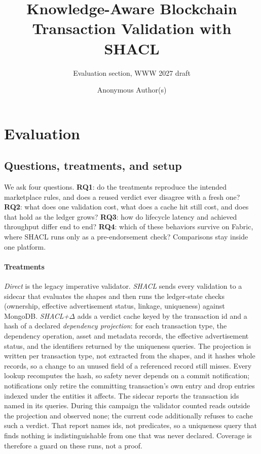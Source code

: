 \documentclass[sigconf,anonymous,review]{acmart}
\title{Knowledge-Aware Blockchain Transaction Validation with SHACL}
\subtitle{Evaluation section, WWW 2027 draft}
\author{Anonymous Author(s)}
\begin{document}
\maketitle

\setcounter{section}{4}
\section{Evaluation}
\label{sec:eval}

\subsection{Questions, treatments, and setup}
\label{sec:setup}

We ask four questions. \textbf{RQ1}: do the treatments reproduce the
intended marketplace rules, and does a reused verdict ever disagree with a
fresh one? \textbf{RQ2}: what does one validation cost, what does a cache hit
still cost, and does that hold as the ledger grows? \textbf{RQ3}: how do
lifecycle latency and achieved throughput differ end to end? \textbf{RQ4}:
which of these behaviors survive on Fabric, where SHACL runs only as a
pre-endorsement check? Comparisons stay inside one platform.

\paragraph{Treatments}
\emph{Direct} is the legacy imperative validator. \emph{SHACL} sends every
validation to a sidecar that evaluates the shapes and then runs the
ledger-state checks (ownership, effective advertisement status, linkage,
uniqueness) against MongoDB. \emph{SHACL+$\Delta$} adds a verdict cache keyed
by the transaction id and a hash of a declared \emph{dependency projection}:
for each transaction type, the dependency operation, asset and metadata
records, the effective advertisement status, and the identifiers returned by
the uniqueness queries. The projection is written per transaction type, not
extracted from the shapes, and it hashes whole records, so a change to an
unused field of a referenced record still misses. Every lookup recomputes the
hash, so safety never depends on a commit notification; notifications only
retire the committing transaction's own entry and drop entries indexed under
the entities it affects. The sidecar reports the transaction ids named in its
queries. During this campaign the validator counted reads outside the
projection and observed none; the current code additionally refuses to cache
such a verdict. That report names ids, not predicates, so a uniqueness query
that finds nothing is indistinguishable from one that was never declared.
Coverage is therefore a guard on these runs, not a proof.
\end{document}
